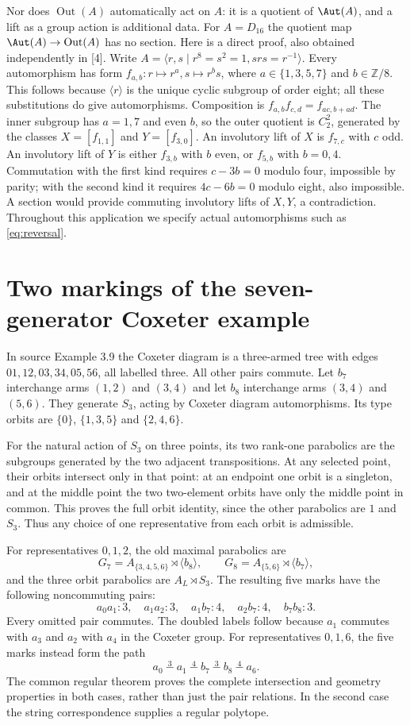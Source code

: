 Nor does $\operatorname{Out}(A)$ automatically act on $A$: it is a
quotient of $\Aut(A)$, and a lift as a group action is additional data.
For $A=D_{16}$ the quotient map $\Aut(A)\to\operatorname{Out}(A)$
has no section. Here is a direct proof, also obtained independently in [4].
Write $A=\langle r,s\mid r^8=s^2=1,srs=r^{-1}\rangle$. Every
automorphism has form $f_{a,b}:r\mapsto r^a,s\mapsto r^bs$,
where $a\in\{1,3,5,7\}$ and $b\in\mathbb Z/8$. This follows
because $\langle r\rangle$ is the unique cyclic subgroup of order
eight; all these substitutions do give automorphisms. Composition is
$f_{a,b}f_{c,d}=f_{ac,b+ad}$. The inner subgroup has $a=1,7$ and
even $b$, so the outer quotient is $C_2^2$, generated by the classes
$X=[f_{1,1}]$ and $Y=[f_{3,0}]$.
An involutory lift of $X$ is $f_{7,c}$ with $c$ odd. An involutory
lift of $Y$ is either $f_{3,b}$ with $b$ even, or $f_{5,b}$ with
$b=0,4$. Commutation with the first kind requires $c-3b=0$ modulo
four, impossible by parity; with the second kind it requires
$4c-6b=0$ modulo eight, also impossible. A section would provide
commuting involutory lifts of $X,Y$, a contradiction. Throughout this
application we specify actual automorphisms such as \eqref{eq:reversal}.

\section{Two markings of the seven-generator Coxeter example}
In source Example 3.9 the Coxeter diagram is a three-armed tree with
edges $01,12,03,34,05,56$, all labelled three. All other pairs commute.
Let $b_7$ interchange arms $(1,2)$ and $(3,4)$ and let $b_8$
interchange arms $(3,4)$ and $(5,6)$. They generate $S_3$, acting by
Coxeter diagram automorphisms. Its type orbits are
$\{0\}$, $\{1,3,5\}$ and $\{2,4,6\}$.

For the natural action of $S_3$ on three points, its two rank-one
parabolics are the subgroups generated by the two adjacent transpositions.
At any selected point, their orbits intersect only in that point: at an
endpoint one orbit is a singleton, and at the middle point the two
two-element orbits have only the middle point in common. This proves
the full orbit identity, since the other parabolics are $1$ and $S_3$.
Thus any choice of one representative from each orbit is admissible.

For representatives $0,1,2$, the old maximal parabolics are
\[
 G_7=A_{\{3,4,5,6\}}\rtimes\langle b_8\rangle,
 \qquad G_8=A_{\{5,6\}}\rtimes\langle b_7\rangle,
\]
and the three orbit parabolics are $A_L\rtimes S_3$. The resulting
five marks have the following noncommuting pairs:
\[
 a_0a_1:3,\quad a_1a_2:3,\quad
 a_1b_7:4,\quad a_2b_7:4,\quad b_7b_8:3.
\]
Every omitted pair commutes. The doubled labels follow because $a_1$
commutes with $a_3$ and $a_2$ with $a_4$ in the Coxeter group.
For representatives $0,1,6$, the five marks instead form the path
\[
 a_0\ \mathrel{\overset{3}{-}}\ a_1\
 \mathrel{\overset{4}{-}}\ b_7\
 \mathrel{\overset{3}{-}}\ b_8\
 \mathrel{\overset{4}{-}}\ a_6.
\]
The common regular theorem proves the complete intersection and geometry
properties in both cases, rather than just the pair relations. In the
second case the string correspondence supplies a regular polytope.

